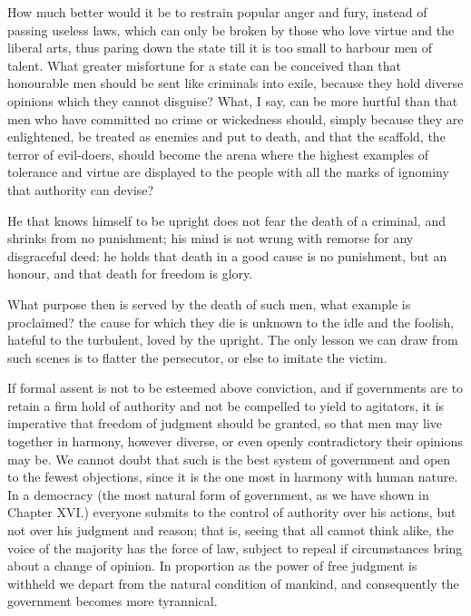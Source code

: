 How much better would it be to restrain popular anger and
fury, instead of passing useless laws, which can only be broken by
those who love virtue and the liberal arts, thus paring down the state
till it is too small to harbour men of talent. What greater
misfortune for a state can be conceived than that honourable men
should be sent like criminals into exile, because they hold diverse
opinions which they cannot disguise? What, I say, can be more hurtful
than that men who have committed no crime or wickedness should, simply
because they are enlightened, be treated as enemies and put to death,
and that the scaffold, the terror of evil-doers, should become the
arena where the highest examples of tolerance and virtue are displayed
to the people with all the marks of ignominy that authority can
devise?

He that knows himself to be upright does not fear the death of a
criminal, and shrinks from no punishment; his mind is not wrung with
remorse for any disgraceful deed: he holds that death in a good cause
is no punishment, but an honour, and that death for freedom is glory.

What purpose then is served by the death of such men, what example is
proclaimed? the cause for which they die is unknown to the idle and
the foolish, hateful to the turbulent, loved by the upright. The only
lesson we can draw from such scenes is to flatter the persecutor, or
else to imitate the victim.

If formal assent is not to be esteemed above conviction, and if
governments are to retain a firm hold of authority and not be
compelled to yield to agitators, it is imperative that freedom of
judgment should be granted, so that men may live together in harmony,
however diverse, or even openly contradictory their opinions may be.
We cannot doubt that such is the best system of government and open to
the fewest objections, since it is the one most in harmony with human
nature. In a democracy (the most natural form of government, as we
have shown in Chapter XVI.) everyone submits to the control of
authority over his actions, but not over his judgment and reason; that
is, seeing that all cannot think alike, the voice of the majority has
the force of law, subject to repeal if circumstances bring about a
change of opinion. In proportion as the  power of free
judgment is withheld we depart from the natural condition of mankind,
and consequently the government becomes more tyrannical.

